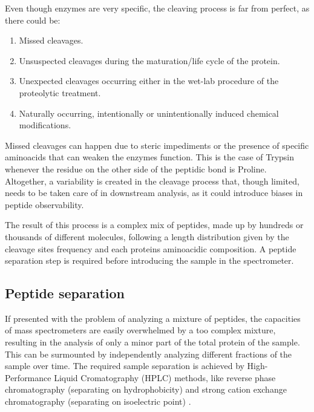 \documentclass[thesis]{subfiles}
\begin{document}
Even though enzymes are very specific, the cleaving process is far from perfect, as there could be: \cite{Barsnes2008}

\begin{enumerate}

\item Missed cleavages.

\item Unsuspected cleavages during the maturation/life cycle of the protein.

\item Unexpected cleavages occurring either in the wet-lab procedure of the proteolytic treatment.

\item Naturally occurring, intentionally or unintentionally induced chemical modifications.

\end{enumerate}


Missed cleavages can happen due to steric impediments or the presence of specific aminoacids that can weaken the enzyme\textquotesingle s function. This is the case of Trypsin whenever the residue on the other side of the peptidic bond is Proline. Altogether, a variability is created in the cleavage process that, though limited, needs to be taken care of in downstream analysis, as it could introduce biases in peptide observability. 

The result of this process is a complex mix of peptides, made up by hundreds or thousands of different molecules, following a length distribution given by the cleavage sites frequency and each protein\textquotesingle s aminoacidic composition. A peptide separation step is required before introducing the sample in the spectrometer.

\subsection{Peptide separation}
\label{subsec:peptide_separation}

If presented with the problem of analyzing a mixture of peptides, the capacities of mass spectrometers are easily overwhelmed by a too complex mixture, resulting in the analysis of only a minor part of the total protein of the sample. This can be surmounted by independently analyzing different fractions of the sample over time. The required sample separation is achieved by High-Performance Liquid Cromatography (\ac{HPLC}) methods, like reverse phase chromatography (separating on hydrophobicity) and strong cation exchange chromatography (separating on isoelectric point) \cite{Barsnes2008}.
\end{document}
